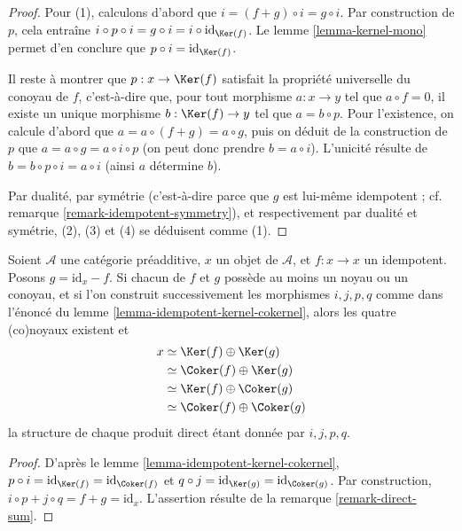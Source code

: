 \begin{proof}
Pour (1), calculons d'abord que $i = (f + g) \circ i = g \circ i$.
Par construction de $p$, cela entraîne
$i \circ p \circ i = g \circ i = i \circ \text{id} _ {\Ker (f)}$.
Le lemme \ref{lemma-kernel-mono} permet d'en conclure que
$p \circ i = \text{id} _ {\Ker (f)}$.

\medskip\noindent
Il reste à montrer que $p : x \to \Ker (f)$
satisfait la propriété universelle du conoyau de $f$,
c'est-à-dire que, pour tout morphisme $a : x \to y$ tel que $a \circ f = 0$,
il existe un unique morphisme $b : \Ker (f) \to y$
tel que $a = b \circ p$.
Pour l'existence, on calcule d'abord que $a = a \circ (f + g) = a \circ g$,
puis on déduit de la construction de $p$
que $a = a \circ g = a \circ i \circ p$
(on peut donc prendre $b = a \circ i$).
L'unicité résulte de $b = b \circ p \circ i = a \circ i$
(ainsi $a$ détermine $b$).

\medskip\noindent
Par dualité,
par symétrie (c'est-à-dire parce que $g$ est lui-même idempotent ;
cf. remarque \ref{remark-idempotent-symmetry}),
et respectivement par dualité et symétrie, (2), (3) et (4) se déduisent comme (1).
\end{proof}

\begin{lemma}
\label{lemma-idempotent-splitting}
Soient $\mathcal{A}$ une catégorie préadditive,
$x$ un objet de $\mathcal{A}$,
et $f : x \to x$ un idempotent.
Posons $g = \text{id} _ x - f$.
Si chacun de $f$ et $g$ possède au moins un noyau ou un conoyau,
et si l'on construit successivement les morphismes $i , j , p , q$
comme dans l'énoncé du lemme \ref{lemma-idempotent-kernel-cokernel},
alors les quatre (co)noyaux existent et
\begin{align*}
x
& \simeq \Ker (f) \oplus \Ker (g) \\
& \simeq \Coker (f) \oplus \Ker (g) \\
& \simeq \Ker (f) \oplus \Coker (g) \\
& \simeq \Coker (f) \oplus \Coker (g)
\end{align*}
la structure de chaque produit direct étant donnée par $i , j , p , q$.
\end{lemma}

\begin{proof}
D'après le lemme \ref{lemma-idempotent-kernel-cokernel},
$p \circ i = \text{id} _ {\Ker (f)} = \text{id} _ {\Coker (f)}$
et $q \circ j = \text{id} _ {\Ker (g)} = \text{id} _ {\Coker (g)}$.
Par construction, $i \circ p + j \circ q = f + g = \text{id} _ x$.
L'assertion résulte de la remarque \ref{remark-direct-sum}.
\end{proof}

